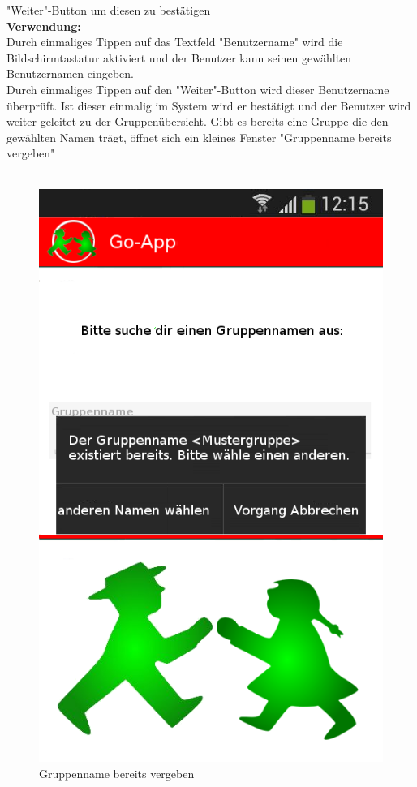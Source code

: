 "Weiter"-Button um diesen zu bestätigen\\
\textbf{Verwendung:}\\
Durch einmaliges Tippen auf das Textfeld "Benutzername" wird die Bildschirmtastatur aktiviert und der Benutzer kann seinen gewählten Benutzernamen eingeben.\\
Durch einmaliges Tippen auf den "Weiter"-Button wird dieser Benutzername überprüft. Ist dieser einmalig im System wird er bestätigt und der Benutzer wird weiter geleitet zu der Gruppenübersicht. Gibt es bereits eine Gruppe die den gewählten Namen trägt, öffnet sich ein kleines Fenster "Gruppenname bereits vergeben"\\ \\

\begin{figure} [H]
	\caption{Gruppenname bereits vergeben}
\begin{center}
	\includegraphics[scale =0.5]{resources/images/gruppe_erstellen_ungueltig.png}
\end{center}
\end{figure}
